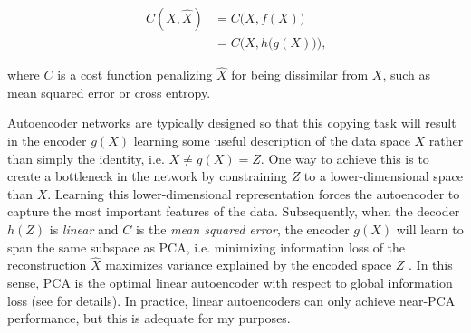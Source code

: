 \documentclass[11pt,a4paper,oneside]{article}
\begin{document}
\begin{appendices}
\begin{equation}
\begin{split}
C(X,\hat{X}) & = C\big(X, f(X)\big) \\
& = C\Big(X, h\big(g(X)\big)\Big) \text{,}
\end{split}
\end{equation}

where $C$ is a cost function penalizing $\hat{X}$ for being dissimilar from $X$, such as mean squared error or cross entropy.
\par
Autoencoder networks are typically designed so that this copying task will result in the encoder $g(X)$ learning some useful description of the data space $X$ rather than simply the identity, i.e. $X \neq g(X) = Z$. One way to achieve this is to create a bottleneck in the network by constraining $Z$ to a lower-dimensional space than $X$. Learning this lower-dimensional representation forces the autoencoder to capture the most important features of the data. Subsequently, when the decoder $h(Z)$ is \textit{linear} and $C$ is the \textit{mean squared error}, the encoder $g(X)$ will learn to span the same subspace as PCA, i.e.  minimizing information loss of the reconstruction $\hat{X}$ maximizes variance explained by the encoded space $Z$ \citep{deeplearningbook}. In this sense, PCA is the optimal linear autoencoder with respect to global information loss (see \citealt{magdon2015} for details). In practice, linear autoencoders can only achieve near-PCA performance, but this is adequate for my purposes. 


\end{appendices}
\end{document}
